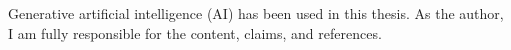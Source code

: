 
Generative artificial intelligence (AI) has been used in this thesis.
As the author, I am fully responsible for the content, claims, and references.

\lipsum[2]
